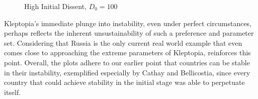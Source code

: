\documentclass[12pt]{article}
\begin{document}
\begin{spacing}{1.5}
\begin{figure}[htb]
\centering 
{} 
\caption{High Initial Dissent, $D_0=100$}

\end{figure}

Kleptopia's immediate plunge into instability, even under perfect circumstances, perhaps reflects the inherent unsustainability of such a preference and parameter set. Considering that Russia is the only current real world example that even comes close to approaching the extreme parameters of Kleptopia, reinforces this point. Overall, the plots adhere to our earlier point that countries can be stable in their instability, exemplified especially by Cathay and Bellicostia, since every country that could achieve stability in the initial stage was able to perpetuate itself.   


\end{spacing}
\end{document}
